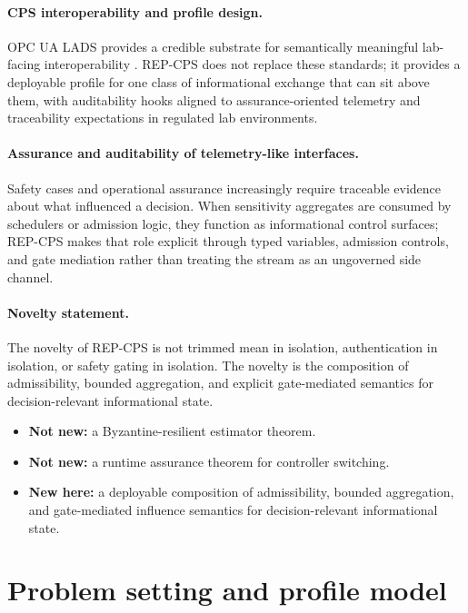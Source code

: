 \documentclass[11pt]{article}
\newcommand{\repcps}{REP-CPS}
\begin{document}
\paragraph{CPS interoperability and profile design.}
OPC UA LADS provides a credible substrate for semantically meaningful lab-facing interoperability \cite{opclads2023}. \repcps{} does not replace these standards; it provides a deployable profile for one class of informational exchange that can sit above them, with auditability hooks aligned to assurance-oriented telemetry and traceability expectations in regulated lab environments.

\paragraph{Assurance and auditability of telemetry-like interfaces.}
Safety cases and operational assurance increasingly require traceable evidence about what influenced a decision. When sensitivity aggregates are consumed by schedulers or admission logic, they function as informational control surfaces; \repcps{} makes that role explicit through typed variables, admission controls, and gate mediation rather than treating the stream as an ungoverned side channel.

\paragraph{Novelty statement.}
The novelty of \repcps{} is not trimmed mean in isolation, authentication in isolation, or safety gating in isolation. The novelty is the composition of admissibility, bounded aggregation, and explicit gate-mediated semantics for decision-relevant informational state.
\begin{itemize}[leftmargin=1.5em]
    \item \textbf{Not new:} a Byzantine-resilient estimator theorem.
    \item \textbf{Not new:} a runtime assurance theorem for controller switching.
    \item \textbf{New here:} a deployable composition of admissibility, bounded aggregation, and gate-mediated influence semantics for decision-relevant informational state.
\end{itemize}

\section{Problem setting and profile model}
\end{document}
